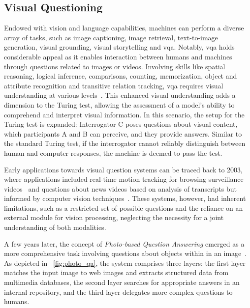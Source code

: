 
\subsection{Visual Questioning}
Endowed with vision and language capabilities, machines can perform a diverse array of tasks, such as image captioning, image retrieval, text-to-image generation, visual grounding, visual storytelling and \gls{vqa}. Notably, \gls{vqa} holds considerable appeal as it enables interaction between humans and machines through questions related to images or videos. Involving skills like spatial reasoning, logical inference, comparisons, counting, memorization, object and attribute recognition and transitive relation tracking, \gls{vqa} requires visual understanding at various levels~\cite{hudson2019gqa}. This enhanced visual understanding adds a dimension to the Turing test, allowing the assessment of a model's ability to comprehend and interpret visual information. In this scenario, the setup for the Turing test is expanded: Interrogator C poses questions about visual content, which participants A and B can perceive, and they provide answers. Similar to the standard Turing test, if the interrogator cannot reliably distinguish between human and computer responses, the machine is deemed to pass the test.   

Early applications towards visual question systems can be traced back to 2003, where applications included real-time motion tracking for browsing surveillance videos~\cite{katz2003answering} and questions about news videos based on analysis of transcripts but informed by computer vision techniques~\cite{yang2003videoqa}. These systems, however, had inherent limitations, such as a restricted set of possible questions and the reliance on an external module for vision processing, neglecting the necessity for a joint understanding of both modalities.

A few years later, the concept of \textit{Photo-based Question Answering} emerged as a more comprehensive task involving questions about objects within in an image~\cite{yeh2008photo}. As depicted in \fig~\ref{fig:photo_qa}, the system comprises three layers: the first layer matches the input image to web images and extracts structured data from multimedia databases, the second layer searches for appropriate answers in an internal repository, and the third layer delegates more complex questions to humans.

